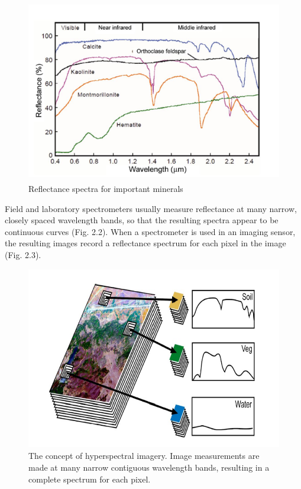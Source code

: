 \documentclass[document.tex]{subfiles}
\begin{document}
\begin{figure}[H]
	\begin{center}
		\includegraphics[height=8.0cm]{imgs/Minerals.png}
	\end{center}
	\caption{Reflectance spectra for important minerals}
	\label{fig: Reflectance spectra for important minerals}
\end{figure}
\noindent Field and laboratory spectrometers usually measure reflectance at many narrow,
closely spaced wavelength bands, so that the resulting spectra appear to be continuous curves (Fig. 2.2). When a spectrometer is used in an imaging sensor, the resulting
images record a reflectance spectrum for each pixel in the image (Fig. 2.3).
\begin{figure}[H]
	\begin{center}
		\includegraphics[height=8.0cm]{imgs/Hyperspectral_imagery.png}
	\end{center}
	\caption{The concept of hyperspectral imagery. Image measurements are made at
		many narrow contiguous wavelength bands, resulting in a complete spectrum for each
		pixel.}
	\label{fig: Hyperspectral imagery}
\end{figure}
\end{document}
